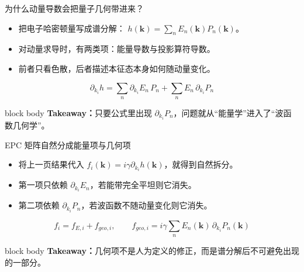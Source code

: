 \documentclass[aspectratio=169,11pt,UTF8]{ctexbeamer}
\newcommand{\takeaway}[1]{%
  \vfill
  \begin{beamercolorbox}[wd=\textwidth,sep=0.7ex,rounded=true]{block body}
    \small\textbf{Takeaway：}#1
  \end{beamercolorbox}
}
\begin{document}
\begin{frame}{为什么动量导数会把量子几何带进来？}
  \begin{itemize}
    \item 把电子哈密顿量写成谱分解：
    $h(\mathbf{k})=\sum_n E_n(\mathbf{k})P_n(\mathbf{k})$。
    \item 对动量求导时，有两类项：能量导数与投影算符导数。
    \item 前者只看色散，后者描述本征态本身如何随动量变化。
  \end{itemize}
  \begin{equation*}
    \partial_{k_i} h
    =
    \sum_n \partial_{k_i} E_n \, P_n
    +
    \sum_n E_n \, \partial_{k_i} P_n
  \end{equation*}
  \takeaway{只要公式里出现 $\partial_{k_i}P_n$，问题就从“能量学”进入了“波函数几何学”。}
\end{frame}

\begin{frame}{EPC 矩阵自然分成能量项与几何项}
  \begin{itemize}
    \item 将上一页结果代入 $f_i(\mathbf{k})=i\gamma \partial_{k_i}h(\mathbf{k})$，就得到自然拆分。
    \item 第一项只依赖 $\partial_{k_i}E_n$，若能带完全平坦则它消失。
    \item 第二项依赖 $\partial_{k_i}P_n$，若波函数不随动量变化则它消失。
  \end{itemize}
  \begin{equation*}
    f_i = f_{E,i} + f_{{geo},i}, \qquad
    f_{{geo},i}
    =
    i\gamma \sum_n E_n(\mathbf{k}) \, \partial_{k_i} P_n(\mathbf{k})
  \end{equation*}
  \takeaway{几何项不是人为定义的修正，而是谱分解后不可避免出现的一部分。}
\end{frame}
\end{document}
